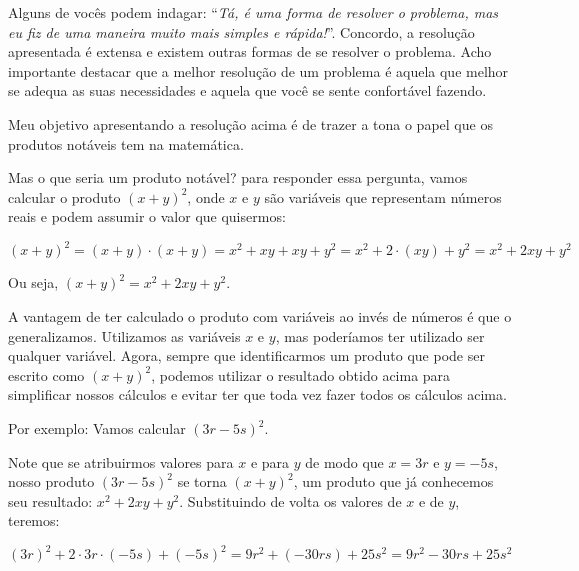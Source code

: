 \documentclass[a4paper, 12pt]{article}
\begin{document}
\noindent Alguns de vocês podem indagar: %
``\textit{Tá, é uma forma de resolver o problema, mas eu fiz de uma maneira muito mais simples e rápida!}''. Concordo, a resolução apresentada é extensa e existem outras formas de se resolver o problema. Acho importante destacar que a melhor resolução de um problema é aquela que melhor se adequa as suas necessidades e aquela que você se sente confortável fazendo.  

\noindent Meu objetivo apresentando a resolução acima é de trazer a tona o papel que os produtos notáveis tem na matemática.   

\noindent Mas o que seria um produto notável? para responder essa pergunta, vamos calcular o produto   \((x+y)^2\), onde   \(x\) e  \(y\) são variáveis que representam números reais e podem assumir o valor que quisermos: 

\noindent  \((x+y)^2 = (x+y)\cdot{(x+y)} =  x^2 + xy + xy + y^2 = x^2 + 2\cdot{(xy)} + y^2 = x^2 + 2xy + y^2\)



\noindent Ou seja, 
  \((x+y)^2 = x^2 + 2xy + y^2\). 

\noindent A vantagem de ter calculado o produto com variáveis ao invés de números é que o ge\-ne\-ra\-li\-za\-mos. Utilizamos as variáveis   \(x\) e \(y\), mas poderíamos ter utilizado ser qualquer variável. Agora, sempre que identificarmos um produto que pode ser escrito como   \((x+y)^2\), podemos utilizar o resultado obtido acima para simplificar nossos cálculos e evitar ter que toda vez fazer todos os cálculos acima.  


\noindent Por exemplo: Vamos calcular   \((3r - 5s)^2\). 

\noindent Note que se atribuirmos valores para   \(x\) e para \(y\) de modo que \(x = 3r\) e \(y = -5s\), nosso produto \((3r - 5s)^2\) se torna \((x + y)^2\), um produto que já conhecemos seu resultado: \(x^2 + 2xy + y^2\). Substituindo de volta os valores de \(x\) e de \(y\), teremos: 

\((3r)^2 + 2\cdot{3r}\cdot{(-5s)} + (-5s)^2 = 9r^2 + (-30rs) + 25s^2 = 9r^2 - 30rs + 25s^2\)
\end{document}
